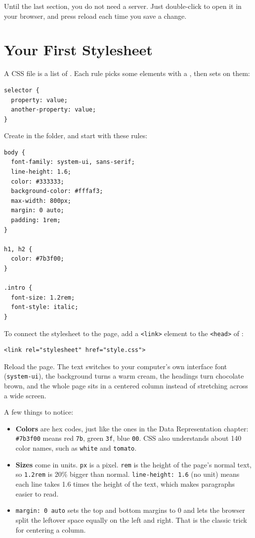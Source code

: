 Until the last section, you do not need a server. Just double-click  to open it in
your browser, and press reload each time you save a change.

\section{Your First Stylesheet}
A CSS file is a list of . Each rule picks some elements with a , then
sets  on them:

\begin{verbatim}
selector {
  property: value;
  another-property: value;
}
\end{verbatim}

Create  in the  folder, and start with these rules:

\begin{verbatim}
body {
  font-family: system-ui, sans-serif;
  line-height: 1.6;
  color: #333333;
  background-color: #fffaf3;
  max-width: 800px;
  margin: 0 auto;
  padding: 1rem;
}

h1, h2 {
  color: #7b3f00;
}

.intro {
  font-size: 1.2rem;
  font-style: italic;
}
\end{verbatim}

To connect the stylesheet to the page, add a \verb|<link>| element to the \verb|<head>| of
:

\begin{verbatim}
<link rel="stylesheet" href="style.css">
\end{verbatim}

Reload the page. The text switches to your computer's own interface font (\verb|system-ui|), the
background turns a warm cream, the headings turn chocolate brown, and the whole page sits in a centered
column instead of stretching across a wide screen.

A few things to notice:
\begin{itemize}
\item \textbf{Colors} are hex codes, just like the ones in the Data Representation chapter: \verb|#7b3f00|
means red \verb|7b|, green \verb|3f|, blue \verb|00|. CSS also understands about 140 color names, such as
\verb|white| and \verb|tomato|.
\item \textbf{Sizes} come in units. \verb|px| is a pixel. \verb|rem| is the height of the page's normal
text, so \verb|1.2rem| is 20\% bigger than normal. \verb|line-height: 1.6| (no unit) means each line takes
1.6 times the height of the text, which makes paragraphs easier to read.
\item \verb|margin: 0 auto| sets the top and bottom margins to 0 and lets the browser split the leftover
space equally on the left and right. That is the classic trick for centering a column.
\end{itemize}

